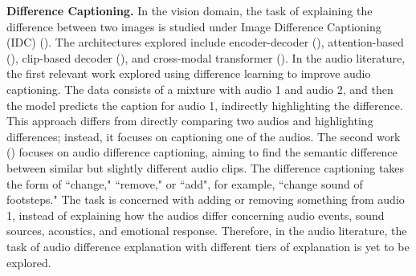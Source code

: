 \noindent \textbf{Difference Captioning.} In the vision domain, the task of explaining the difference between two images is studied under Image Difference Captioning (IDC) (\cite{jhamtani-berg-kirkpatrick-2018-learning,Park_2019_ICCV}). The architectures explored include encoder-decoder (\cite{jhamtani-berg-kirkpatrick-2018-learning}), attention-based (\cite{Park_2019_ICCV}), clip-based decoder (\cite{guo2022clip4idc}), and cross-modal transformer (\cite{yao}). In the audio literature, the first relevant work \cite{adl} explored using difference learning to improve audio captioning. The data consists of a mixture with audio 1 and audio 2, and then the model predicts the caption for audio 1, indirectly highlighting the difference. This approach differs from directly comparing two audios and highlighting differences; instead, it focuses on captioning one of the audios. The second work (\cite{Takeuchi2023}) focuses on audio difference captioning, aiming to find the semantic difference between similar but slightly different audio clips. The difference captioning takes the form of ``change," ``remove," or ``add", for example, ``change sound of footsteps." The task is concerned with adding or removing something from audio 1, instead of explaining how the audios differ concerning audio events, sound sources, acoustics, and emotional response. Therefore, in the audio literature, the task of audio difference explanation with different tiers of explanation is yet to be explored.

